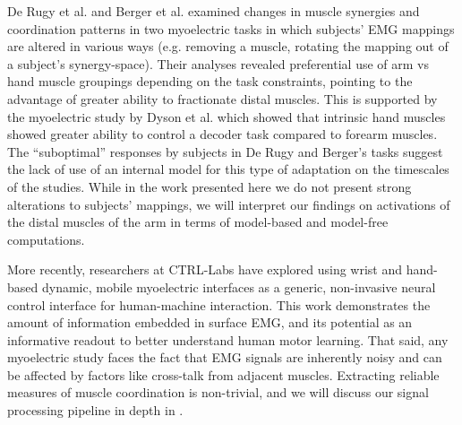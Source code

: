 \documentclass[../main.tex]{subfiles}
\begin{document}
De Rugy et al.\cite{derugyMuscleCoordinationHabitual2012} and Berger et al.\cite{BergerDifferencesInAdaptationRates2013a} examined changes in muscle synergies and coordination patterns in two myoelectric tasks in which subjects' EMG mappings are altered in various ways (e.g. removing a muscle, rotating the mapping out of a subject's synergy-space). Their analyses revealed preferential use of arm vs hand muscle groupings depending on the task constraints, pointing to the advantage of greater ability to fractionate distal muscles. This is supported by the myoelectric study by Dyson et al.\cite{Dyson2018} which showed that intrinsic hand muscles showed greater ability to control a decoder task compared to forearm muscles. The ``suboptimal'' responses by subjects in De Rugy and Berger's tasks suggest the lack of use of an internal model for this type of adaptation on the timescales of the studies. While in the work presented here we do not present strong alterations to subjects' mappings, we will interpret our findings on activations of the distal muscles of the arm in terms of model-based and model-free computations.

More recently, researchers at CTRL-Labs have explored using wrist and hand-based dynamic, mobile myoelectric interfaces as a generic, non-invasive neural control interface for human-machine interaction\cite{ctrl-labsatrealitylabsGenericNoninvasiveNeuromotor2024}. This work demonstrates the amount of information embedded in surface EMG, and its potential as an informative readout to better understand human motor learning. That said, any myoelectric study faces the fact that EMG signals are inherently noisy and can be affected by factors like cross-talk from adjacent muscles. Extracting reliable measures of muscle coordination is non-trivial, and we will discuss our signal processing pipeline in depth in . 




\end{document}
